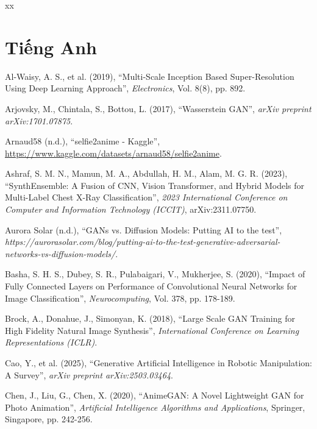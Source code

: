 \begin{thebibliography}{xx}
	\section*{Tiếng Anh}
	\vspace{0.3cm}

Al-Waisy, A. S., et al. (2019), ``Multi-Scale Inception Based Super-Resolution Using Deep Learning Approach'', {\em Electronics}, Vol. 8(8), pp. 892.

Arjovsky, M., Chintala, S., Bottou, L. (2017), ``Wasserstein GAN'', {\em arXiv preprint arXiv:1701.07875}.

Arnaud58 (n.d.), ``selfie2anime - Kaggle'', \url{https://www.kaggle.com/datasets/arnaud58/selfie2anime}.

Ashraf, S. M. N., Mamun, M. A., Abdullah, H. M., Alam, M. G. R. (2023), ``SynthEnsemble: A Fusion of CNN, Vision Transformer, and Hybrid Models for Multi-Label Chest X-Ray Classification'', {\em 2023 International Conference on Computer and Information Technology (ICCIT)}, arXiv:2311.07750.

Aurora Solar (n.d.), ``GANs vs. Diffusion Models: Putting AI to the test'', {\em https://aurorasolar.com/blog/putting-ai-to-the-test-generative-adversarial-networks-vs-diffusion-models/}.

Basha, S. H. S., Dubey, S. R., Pulabaigari, V., Mukherjee, S. (2020), ``Impact of Fully Connected Layers on Performance of Convolutional Neural Networks for Image Classification'', {\em Neurocomputing}, Vol. 378, pp. 178-189.

Brock, A., Donahue, J., Simonyan, K. (2018), ``Large Scale GAN Training for High Fidelity Natural Image Synthesis'', {\em International Conference on Learning Representations (ICLR)}.

Cao, Y., et al. (2025), ``Generative Artificial Intelligence in Robotic Manipulation: A Survey'', {\em arXiv preprint arXiv:2503.03464}.

Chen, J., Liu, G., Chen, X. (2020), ``AnimeGAN: A Novel Lightweight GAN for Photo Animation'', {\em Artificial Intelligence Algorithms and Applications}, Springer, Singapore, pp. 242-256.


\end{thebibliography}
